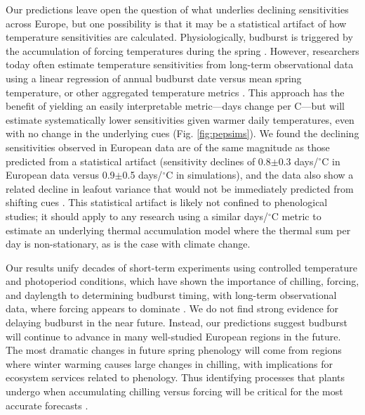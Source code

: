 \documentclass{article}
\begin{document}
\par Our predictions leave open the question of what underlies declining sensitivities across Europe, but one possibility is that it may be a statistical artifact of how temperature sensitivities are calculated. Physiologically, budburst is triggered by the accumulation of forcing temperatures during the spring \emph{\citep{chuine2016,hanninen1995}}. However, researchers today often estimate temperature sensitivities from long-term observational data using a linear regression of annual budburst date versus mean spring temperature, or other aggregated temperature metrics \emph{\citep[e.g.,][]{Wolkovich:2012n}}. This approach has the benefit of yielding an easily interpretable metric---days change per \degree C---but will estimate systematically lower sensitivities given warmer daily temperatures, even with no change in the underlying cues (Fig. \ref{fig:pepsims}). We found the declining sensitivities observed in European data are of the same magnitude as those predicted from a statistical artifact (sensitivity declines of 0.8$\pm$0.3 days/$^{\circ}$C in European data versus 0.9$\pm$0.5 days/$^{\circ}$C in simulations), and the data also show a related decline in leafout variance that would not be immediately predicted from shifting cues \emph{\citep[ \emph{Potential statistical artifacts in declines of temperature sensitivity in observational long-term data} ][]{gusewell2017}}. This statistical artifact is likely not confined to phenological studies; it should apply to any research using a similar days/$^{\circ}$C metric to estimate an underlying thermal accumulation model where the thermal sum per day is non-stationary, as is the case with climate change. 

 \par Our results unify decades of short-term experiments using controlled temperature and photoperiod conditions, which have shown the importance of chilling, forcing, and daylength to determining budburst timing, with long-term observational data, where forcing appears to dominate \emph{\citep[e.g.,][]{roberts2015}}. We do not find strong evidence for delaying budburst in the near future. Instead, our predictions suggest budburst will continue to advance in many well-studied European regions in the future. The most dramatic changes in future spring phenology will come from regions where winter warming causes large changes in chilling, with implications for ecosystem services related to phenology. Thus identifying processes that plants undergo when accumulating chilling versus forcing will be critical for the most accurate forecasts \emph{\citep{chuine2016,Singh:2017}}. %
\end{document}
